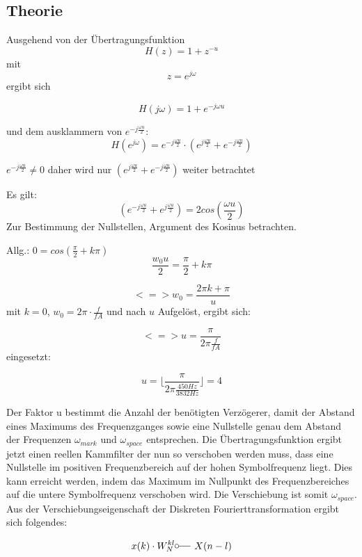 \documentclass{article}
\begin{document}
\subsection{Theorie}


Ausgehend von der Übertragungsfunktion 
$$H(z) = 1 + z^{-u}$$ 
mit 
$$ z = e^{j\omega} $$
ergibt sich

$$H(j\omega) = 1 + e^{-j\omega u}$$

und dem ausklammern von $ e^{-j \frac{\omega u}{2}}$:
$$
H(e^{j\omega}) = e^{-j \frac{\omega u}{2}} \cdot (e^{j \frac{\omega u}{2}} + e^{-j \frac{\omega u}{2}})
$$

$e^{-j \frac{\omega u}{2}} \neq 0$ daher wird nur $(e^{j \frac{\omega u}{2}} + e^{-j \frac{\omega u}{2}})$ weiter betrachtet

Es gilt:
$$
(e^{-j \frac{\omega u}{2}} + e^{j \frac{\omega u}{2}}) = 2  cos(\frac{\omega u}{2})
$$
Zur Bestimmung der Nullstellen, Argument des Kosinus betrachten.

Allg.: $0 = cos(\frac{\pi}{2} + k\pi)$
$$
\frac{w_0 u}{2} = \frac{\pi}{2} + k\pi
$$

$$
<=> w_0 = \frac{2\pi k + \pi}{u}
$$
mit $k = 0$, $w_0 = 2\pi \cdot \frac{f}{fA}$ und nach $u$ Aufgelöst, ergibt sich:

$$
<=> u = \frac{\pi}{2\pi \frac{f}{fA}}
$$
eingesetzt:

$$
u = \lfloor \frac{\pi}{2\pi \frac{450Hz}{3832Hz}}\rfloor = 4
$$

Der Faktor u bestimmt die Anzahl der benötigten Verzögerer, damit der Abstand eines Maximums des Frequenzganges sowie eine Nullstelle genau dem Abstand der Frequenzen $\omega_{mark}$ und $\omega_{space}$ entsprechen. Die Übertragungsfunktion ergibt jetzt einen reellen Kammfilter der nun so verschoben werden muss, dass eine Nullstelle im positiven Frequenzbereich auf der hohen Symbolfrequenz liegt. Dies kann erreicht werden, indem das Maximum im Nullpunkt des Frequenzbereiches auf die untere Symbolfrequenz verschoben wird. Die Verschiebung ist somit $\omega_{space}$.
Aus der Verschiebungseigenschaft der Diskreten Fourierttransformation ergibt sich folgendes:
 
$$
x(k) \cdot W^{kl}_N \fourier X(n-l)
$$
\end{document}
